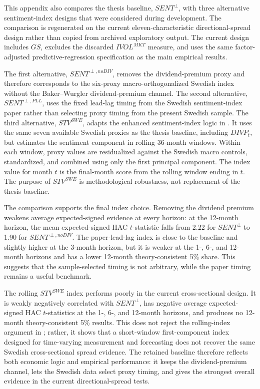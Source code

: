 \documentclass[11pt]{article}
\newcommand{\var}[1]{\ensuremath{#1}}
\begin{document}
This appendix also compares the thesis baseline, \var{SENT^{\perp}}, with three alternative sentiment-index designs that were considered during development. The comparison is regenerated on the current eleven-characteristic directional-spread design rather than copied from archived exploratory output. The current design includes \var{GS}, excludes the discarded \var{IVOL^{MKT}} measure, and uses the same factor-adjusted predictive-regression specification as the main empirical results.

The first alternative, \var{SENT^{\perp,noDIV}}, removes the dividend-premium proxy and therefore corresponds to the six-proxy macro-orthogonalized Swedish index without the Baker--Wurgler dividend-premium channel. The second alternative, \var{SENT^{\perp,PLL}}, uses the fixed lead-lag timing from the Swedish sentiment-index paper rather than selecting proxy timing from the present Swedish sample. The third alternative, \var{STV^{SWE}}, adapts the enhanced sentiment-index logic in \citet{ung2024enhanced}. It uses the same seven available Swedish proxies as the thesis baseline, including \var{DIVP_t}, but estimates the sentiment component in rolling 36-month windows. Within each window, proxy values are residualized against the Swedish macro controls, standardized, and combined using only the first principal component. The index value for month \(t\) is the final-month score from the rolling window ending in \(t\). The purpose of \var{STV^{SWE}} is methodological robustness, not replacement of the thesis baseline.



The comparison supports the final index choice. Removing the dividend premium weakens average expected-signed evidence at every horizon: at the 12-month horizon, the mean expected-signed HAC \(t\)-statistic falls from 2.22 for \var{SENT^{\perp}} to 1.90 for \var{SENT^{\perp,noDIV}}. The paper-lead-lag index is close to the baseline and slightly higher at the 3-month horizon, but it is weaker at the 1-, 6-, and 12-month horizons and has a lower 12-month theory-consistent 5\% share. This suggests that the sample-selected timing is not arbitrary, while the paper timing remains a useful benchmark.

The rolling \var{STV^{SWE}} index performs poorly in the current cross-sectional design. It is weakly negatively correlated with \var{SENT^{\perp}}, has negative average expected-signed HAC \(t\)-statistics at the 1-, 6-, and 12-month horizons, and produces no 12-month theory-consistent 5\% results. This does not reject the rolling-index argument in \citet{ung2024enhanced}; rather, it shows that a short-window first-component index designed for time-varying measurement and forecasting does not recover the same Swedish cross-sectional spread evidence. The retained baseline therefore reflects both economic logic and empirical performance: it keeps the dividend-premium channel, lets the Swedish data select proxy timing, and gives the strongest overall evidence in the current directional-spread tests.
\end{document}
